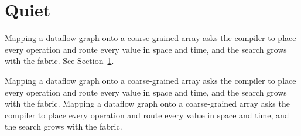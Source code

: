 \documentclass{article}
\begin{document}
\section{Quiet}\label{sec:q}
Mapping a dataflow graph onto a coarse-grained array asks the compiler to place every operation and route every value in space and time, and the search grows with the fabric. %
See Section~\ref{sec:q}.

Mapping a dataflow graph onto a coarse-grained array asks the compiler to place every operation and route every value in space and time, and the search grows with the fabric. Mapping a dataflow graph onto a coarse-grained array asks the compiler to place every operation and route every value in space and time, and the search grows with the fabric.
\end{document}
